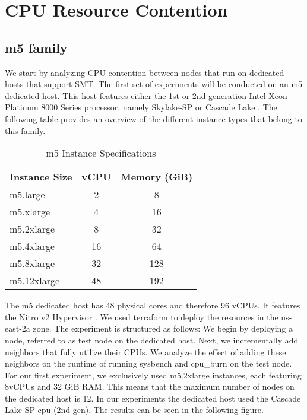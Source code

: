 \chapter{CPU Resource Contention}\label{chapter:cpu}
\section{m5 family}
We start by analyzing CPU contention between nodes that run on dedicated hosts that support \ac{SMT}.
The first set of experiments will be conducted on an m5 dedicated host. This host features either the 1st or 
2nd generation Intel Xeon Platinum 8000 Series processor, namely Skylake-SP or Cascade Lake 
\cite{aws_m5_instances}. The following table provides an overview of the 
different instance types that belong to this family. 
\begin{table}[H]
\centering
\begin{tabular}{lcc}
\hline
\textbf{Instance Size} & \textbf{vCPU} & \textbf{Memory (GiB)} \\
\hline
m5.large     & 2  & 8    \\
m5.xlarge    & 4  & 16   \\
m5.2xlarge   & 8  & 32   \\
m5.4xlarge   & 16 & 64   \\
m5.8xlarge   & 32 & 128  \\
m5.12xlarge  & 48 & 192  \\
\hline
\end{tabular}
\caption{m5 Instance Specifications \cite{aws_m5_instances}}
\end{table}
\noindent
The m5 dedicated host has 48 physical cores and therefore 96 vCPUs. It features the Nitro v2 
Hypervisor \cite{awsEC2GP2025}. We used terraform to deploy the resources in the us-east-2a zone. 
The experiment is structured as follows: We begin by deploying a node, referred to as test node 
on the dedicated host. Next, we incrementally add neighbors that fully utilize their CPUs. 
We analyze the effect of adding these neighbors on the runtime of running sysbench and cpu\_burn on the test 
node.
For our first experiment, we exclusively used m5.2xlarge instances, each featuring 8vCPUs and 32 GiB RAM. 
This means that the maximum number of nodes on the dedicated host is 12. In our experiments the dedicated host used the Cascade Lake-SP cpu (2nd gen). The results can 
be seen in the following figure.

